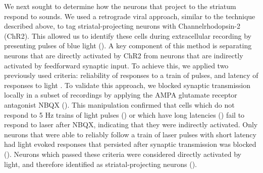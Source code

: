 We next sought to determine how the neurons that project to the striatum respond to sounds. 
%
We used a retrograde viral approach, similar to the technique described above, to tag striatal-projecting neurons with Channelrhodopsin-2 (ChR2).
%
This allowed us to identify these cells during extracellular recording by presenting pulses of blue light \citep{Lima2009} (\fig{\Method}).
%
A key component of this method is separating neurons that are directly activated by ChR2 from neurons that are indirectly activated by feedforward synaptic input. 
%
To achieve this, we applied two previously used criteria: reliability of responses to a train of pulses, and latency of responses to light \citep{Lima2009, Cohen2012}. 
%
To validate this approach, we blocked synaptic transmission locally in a subset of recordings by applying the AMPA glutamate receptor antagonist NBQX (\fig{\MethodDiagram}).
%
This manipulation confirmed that cells which do not respond to 5 Hz trains of light pulses (\fig{\MethodIndirectNoFollow}) or which have long latencies (\fig{\MethodLongLatency}) fail to respond to laser after NBQX, indicating that they were indirectly activated. 
%
Only neurons that were able to reliably follow a train of laser pulses with short latency had light evoked responses that persisted after synaptic transmission was blocked (\fig{\MethodDirectCellAndNBQXPop}).
%
Neurons which passed these criteria were considered directly activated by light, and therefore identified as striatal-projecting neurons (\fig{\MethodSoundCharPop}).

